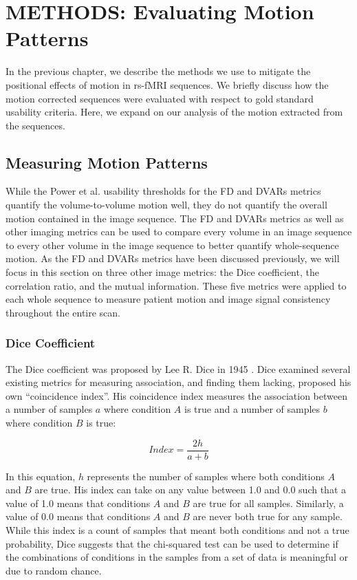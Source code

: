 \chapter{METHODS: Evaluating Motion Patterns}
\label{ch:mopa}

In the previous chapter, we describe the methods we use to mitigate the positional effects of motion in rs-fMRI sequences. We briefly discuss how the motion corrected sequences were evaluated with respect to gold standard usability criteria. Here, we expand on our analysis of the motion extracted from the sequences.

\section{Measuring Motion Patterns}

While the Power et al. usability thresholds for the FD and DVARs metrics quantify the volume-to-volume motion well, they do not quantify the overall motion contained in the image sequence. The FD and DVARs metrics as well as other imaging metrics can be used to compare every volume in an image sequence to every other volume in the image sequence to better quantify whole-sequence motion. As the FD and DVARs metrics have been discussed previously, we will focus in this section on three other image metrics: the Dice coefficient, the correlation ratio, and the mutual information. These five metrics were applied to each whole sequence to measure patient motion and image signal consistency throughout the entire scan.

\subsection{Dice Coefficient}

The Dice coefficient was proposed by Lee R. Dice in 1945 \cite{Dice1945}. Dice examined several existing metrics for measuring association, and finding them lacking, proposed his own ``coincidence index''. His coincidence index measures the association between a number of samples $a$ where condition $A$ is true and a number of samples $b$ where condition $B$ is true:

\begin{equation}
Index = \frac{2h}{a+b}
\end{equation}

In this equation, $h$ represents the number of samples where both conditions $A$ and $B$ are true. His index can take on any value between 1.0 and 0.0 such that a value of 1.0 means that conditions $A$ and $B$ are true for all samples. Similarly, a value of 0.0 means that conditions $A$ and $B$ are never both true for any sample. While this index is a count of samples that meant both conditions and not a true probability, Dice suggests that the chi-squared test can be used to determine if the combinations of conditions in the samples from a set of data is meaningful or due to random chance. 

